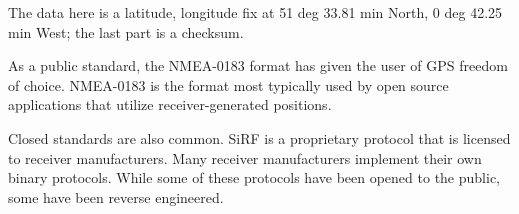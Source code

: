 The data here is a latitude, longitude fix at 51 deg 33.81 min North, 0 deg 42.25 min West; the last part is a checksum.

As a public standard, the NMEA-0183 format has given the user of GPS freedom of choice. NMEA-0183 is the format most typically used by open source applications that utilize receiver-generated positions.

Closed standards are also common. SiRF is a proprietary protocol that is licensed to receiver manufacturers. Many receiver manufacturers implement their own binary protocols. While some of these protocols have been opened to the public, some have been reverse engineered. 

\putbib[gpstk]



